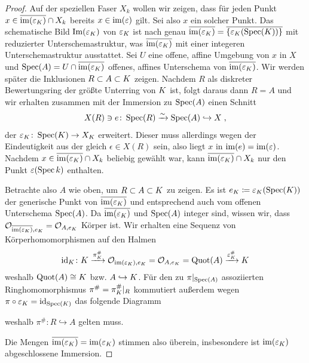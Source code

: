 \begin{Lemma}
\begin{proof}
    Auf der speziellen Faser $X_k$ wollen wir zeigen, dass für jeden
    Punkt $x\in\overline{\operatorname{im}(\varepsilon_{K})}\cap X_k$ bereits
    $x\in\operatorname{im}(\varepsilon)$ gilt. Sei also $x$ ein solcher Punkt.
    Das schematische Bild $\text{Im}(\varepsilon_{K})$ von $\varepsilon_{K}$ ist
    nach \cite[Remark 10.32]{wedhorn} genau
    $\overline{\operatorname{im}(\varepsilon_{K})}=\overline{\{\varepsilon_{K}(\operatorname{Spec}(K))\}}$
    mit reduzierter Unterschemastruktur, was
    $\overline{\operatorname{im}(\varepsilon_{K})}$ mit einer integeren
    Unterschemastruktur ausstattet.
    Sei $U$ eine offene, affine Umgebung von $x$ in $X$ und
    $\operatorname{Spec}(A)=U\cap\overline{\operatorname{im}(\varepsilon_{K})}$ offenes, affines
    Unterschema von $\overline{\operatorname{im}(\varepsilon_{K})}$.
    Wir werden später die Inklusionen $R\subset A\subset K$ zeigen.
    Nachdem $R$ als diskreter Bewertungsring der größte Unterring
    von $K$ ist, folgt daraus dann $R=A$ und wir erhalten zusammen
    mit der Immersion zu $\operatorname{Spec}(A)$ einen Schnitt
    \begin{gather*}
      X(R)\ni e\colon
      \operatorname{Spec}(R)\xrightarrow{\sim}\operatorname{Spec}(A)\hookrightarrow X\;,
    \end{gather*}
    der $\varepsilon_{K}\colon\operatorname{Spec}(K)\to X_{K}$ erweitert.
    Dieser muss allerdings wegen der Eindeutigkeit aus der \NAbbEig
    gleich $\epsilon\in X(R)$ sein, also liegt $x$ in
    $\operatorname{im}(e)=\operatorname{im}(\varepsilon)$.
    Nachdem $x\in \overline{\operatorname{im}(\varepsilon_{K})}\cap X_k$ beliebig
    gewählt war, kann $\overline{\operatorname{im}(\varepsilon_{K})}\cap X_k$ nur
    den Punkt $\varepsilon(\operatorname{Spec} k)$ enthalten.

    Betrachte also $A$ wie oben, um $R\subset A\subset K$ zu
    zeigen. Es ist $e_{K}\coloneqq\varepsilon_{K}(\operatorname{Spec}(K))$ der
    generische Punkt von $\overline{\operatorname{im}(\varepsilon_{K})}$ und
    entsprechend auch vom offenen Unterschema $\operatorname{Spec}(A)$. Da
    $\overline{\operatorname{im}(\varepsilon_{K})}$ und $\operatorname{Spec}(A)$ integer sind, wissen
    wir, dass $\mathcal{O}_{\overline{\text{im}(\varepsilon_{K})}, e_{K}}=\mathcal{O}_{A,e_{K}}$
    Körper ist.
    Wir erhalten eine Sequenz von Körperhomomorphismen auf den Halmen
    \begin{gather*}
      \mathrm{id}_{K}\colon
      K \xrightarrow{\pi_{K}^\#}
      \mathcal{O}_{\text{im}(\varepsilon_{K}), e_{K}} = \mathcal{O}_{A,e_{K}} = \operatorname{Quot}(A)
      \xrightarrow{\varepsilon_{K}^\#} K
    \end{gather*}
    weshalb $\operatorname{Quot}(A)\cong K$ bzw. $A\hookrightarrow K$.
    Für den zu $\pi|_{\operatorname{Spec}(A)}$ assoziierten
    Ringhomomorphismus $\pi^\#=\pi_{K}^\#|_R$ kommutiert außerdem wegen
    $\pi\circ\varepsilon_{K}=\mathrm{id}_{\operatorname{Spec}(K)}$ das folgende Diagramm
    \begin{center}
    \end{center}
    weshalb $\pi^\#\colon R\hookrightarrow A$ gelten muss.
    
    Die Mengen $\overline{\operatorname{im}(\varepsilon_{K})}=\operatorname{im}(\varepsilon_{K})$ stimmen
    also überein, insbesondere ist $\operatorname{im}(\varepsilon_{K})$ abgeschlossene
    Immersion.
  \end{proof}
\end{Lemma}

